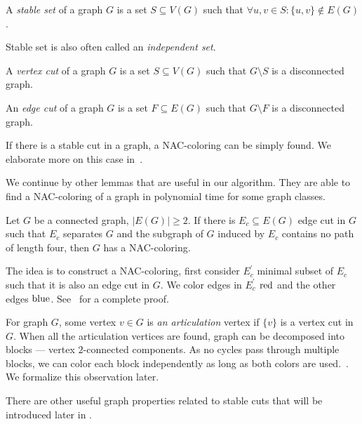 %
\begin{definition}
	A \emph{stable set} of a graph \( G \) is a set \( S \subseteq V(G) \) such that
	\( \forall u, v \in S : \{u, v\} \not\in E(G) \).
\end{definition}
%
Stable set is also often called an \emph{independent set}.
%
\begin{definition}
	A \emph{vertex cut} of a graph \( G \) is a set \( S \subseteq V(G) \) such that
	\( G \setminus S \) is a disconnected graph.
\end{definition}
%
\begin{definition}
	An \emph{edge cut} of a graph \( G \) is a set \( F \subseteq E(G) \) such that
	\( G \setminus F \) is a disconnected graph.
\end{definition}
%
%
If there is a stable cut in a graph, a NAC-coloring can be simply found.
We elaborate more on this case in~.

We continue by other lemmas that are useful in our algorithm.
They are able to find a NAC-coloring of a graph in polynomial time for some graph classes.
%
\begin{lemma}
	Let \( G \) be a connected graph, \( |E(G)| \ge 2 \). If there is \( E_c \subseteq E(G) \)
	edge cut in \( G \) such that \( E_c \) separates \( G \) and the subgraph of \( G \)
	induced by \( E_c \) contains no path of length four, then \( G \) has a NAC-coloring.
\end{lemma}
%
The idea is to construct a NAC-coloring, first consider \( E_c^\prime \) minimal subset of \( E_c \)
such that it is also an edge cut in \( G \).
We color edges in \( E_c^\prime \) \( \text{red} \) and the other edges \( \text{blue} \).
See~\cite{legersky_original} for a complete proof.

For graph \( G \), some vertex \( v \in G \) is \emph{an articulation} vertex if
\( \{v\} \) is a vertex cut in \( G \).
When all the articulation vertices are found,
graph can be decomposed into blocks
--- vertex \( 2 \)-connected components.
As no cycles pass through multiple blocks, we can color each block
independently as long as both colors are used.~\cite{my_paper}.
We formalize this observation later.

There are other useful graph properties related to stable cuts
that will be introduced later in .

